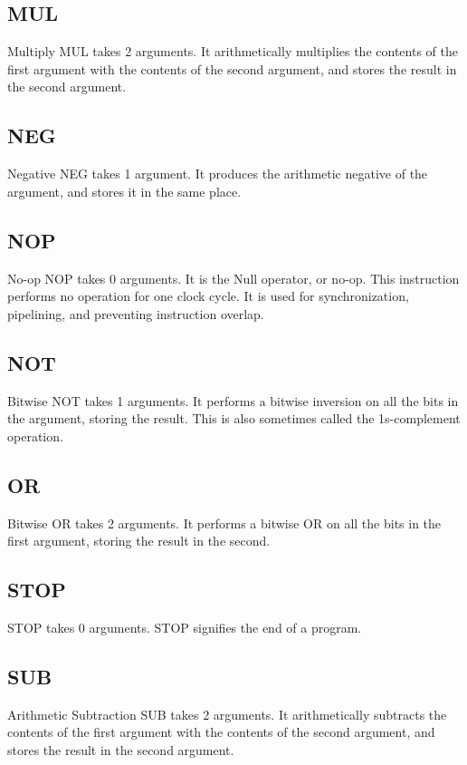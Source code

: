 \documentclass[10pt,fullpage]{article}
\begin{document}
\subsection*{MUL}
Multiply MUL takes 2 arguments. It arithmetically multiplies the
contents of the first argument with the contents of the second
argument, and stores the result in the second argument.

\subsection*{NEG}
Negative NEG takes 1 argument. It produces the arithmetic negative
of the argument, and stores it in the same place.

\subsection*{NOP}
No-op NOP takes 0 arguments. It is the Null operator, or no-op. This
instruction performs no operation for one clock cycle. It is used
for synchronization, pipelining, and preventing instruction overlap.

\subsection*{NOT}
Bitwise NOT takes 1 arguments. It performs a bitwise inversion on
all the bits in the argument, storing the result. This is also
sometimes called the 1s-complement operation.

\subsection*{OR}
Bitwise OR takes 2 arguments. It performs a bitwise OR on all the
bits in the first argument, storing the result in the second.

\subsection*{STOP}
STOP takes 0 arguments. STOP signifies the end of a program.

\subsection*{SUB}
Arithmetic Subtraction SUB takes 2 arguments. It arithmetically
subtracts the contents of the first argument with the contents of
the second argument, and stores the result in the second argument.
\end{document}
